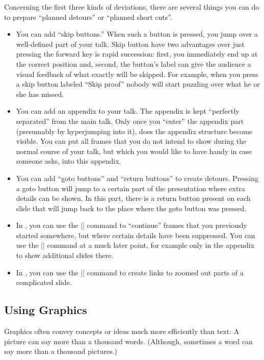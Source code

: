 Concerning the first three kinds of deviations, there are several
things you can do to prepare ``planned detours'' or ``planned
short cuts''.
\begin{itemize}
\item
  You can add ``skip buttons.'' When such a button
  is pressed, you jump over a well-defined part of your talk. Skip
  button have two advantages over just pressing the forward key
  is rapid succession: first, you immediately end up at the correct
  position and, second, the button's label can give the audience a
  visual feedback of what exactly will be skipped. For example, when
  you press a skip button labeled ``Skip proof'' nobody will start
  puzzling over what he or she has missed.
\item
  You can add an appendix to your talk. The appendix is kept
  ``perfectly separated'' from the main talk. Only once you ``enter''
  the appendix part (presumably by hyperjumping into it), does the
  appendix structure become visible. You can put all frames that you
  do not intend to show during the normal course of your talk, but
  which you would like to have handy in case someone asks, into this
  appendix.
\item
  You can add ``goto buttons'' and ``return buttons'' to create
  detours. Pressing a goto button will jump to a certain part of the
  presentation where extra details can be shown. In this part, there
  is a return button present on each slide that will jump back to the
  place where the goto button was pressed.
\item
  In \beamer, you can use the |\againframe| command to ``continue''
  frames that you previously started somewhere, but where certain
  details have been suppressed. You can use the |\againframe| command
  at a much later point, for example only in the appendix to show
  additional slides there.
\item
  In \beamer, you can use the |\framezoom| command to create links to
  zoomed out parts of a complicated slide.
\end{itemize}





\subsection{Using Graphics}

Graphics often convey concepts or ideas much more efficiently than
text: A picture can say more than a thousand words. (Although,
sometimes a word can say more than a thousand pictures.) 


